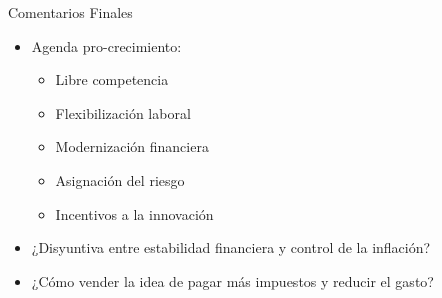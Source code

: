 \begin{frame}{Comentarios Finales}
\begin{itemize}
    \item Agenda pro-crecimiento: 
    \begin{itemize}
        \item Libre competencia
        \item Flexibilización laboral
        \item Modernización financiera 
        \item Asignación del riesgo
        \item Incentivos a la innovación
    \end{itemize}
    \item ¿Disyuntiva entre estabilidad financiera y control de la inflación?
    \item ¿Cómo vender la idea de pagar más impuestos y reducir el gasto?
\end{itemize}
\end{frame}
